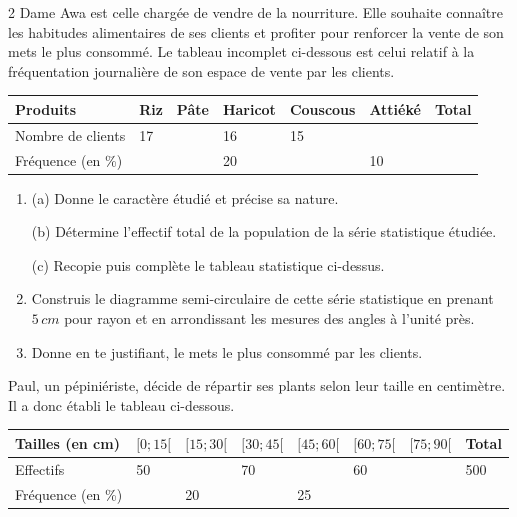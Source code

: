 \begin{multicols*}{2}
  Dame Awa est celle chargée de vendre de la nourriture. Elle souhaite connaître les habitudes alimentaires de ses clients et profiter pour renforcer la vente de son mets le plus consommé. Le tableau incomplet ci-dessous est celui relatif à la fréquentation journalière de son espace de vente par les clients.
 
 \begin{center}
 	\begin{tabular}{|p{1.5cm}|p{0.5cm}|p{0.5cm}|p{1cm}|p{1cm}|p{1cm}|p{0.5cm}|}
 		\hline
 		Produits & Riz & Pâte & Haricot & Couscous & Attiéké & Total \\
 		\hline
 		Nombre de clients & 17 & & 16 & 15 & & \\
 		\hline
 		Fréquence (en \%) & & & 20 & & 10 & \\
 		\hline
 	\end{tabular}
 \end{center}
 
 \begin{enumerate}
 	\item[1.] (a) Donne le caractère étudié et précise sa nature.
 	
 	(b) Détermine l'effectif total de la population de la série statistique étudiée.
 	
 	(c) Recopie puis complète le tableau statistique ci-dessus.
 	\item Construis le diagramme semi-circulaire de cette série statistique en prenant $5\,cm$ pour rayon et en arrondissant les mesures des angles à l'unité près.
 	\item Donne en te justifiant, le mets le plus consommé par les clients.
 \end{enumerate}
 
 Paul, un pépiniériste, décide de répartir ses plants selon leur taille en centimètre. Il a donc établi le tableau ci-dessous.
 
 \begin{center}
 \hspace*{-0.5cm}	\begin{tabular}{|p{1.2cm}|p{0.6cm}|p{0.8cm}|p{0.8cm}|p{0.8cm}|p{0.8cm}|p{0.8cm}|p{0.5cm}|}
 		\hline
 		Tailles (en cm) & $[0;15[$ & $[15;30[$ & $[30;45[$ & $[45;60[$ & $[60;75[$ & $[75;90[$ & Total \\
 		\hline
 		Effectifs & 50 & & 70 & & 60 & & 500 \\
 		\hline
 		Fréquence (en \%) & & 20 & & 25 & & & \\
 		\hline
 	\end{tabular}
 \end{center}
 

\end{multicols*}
